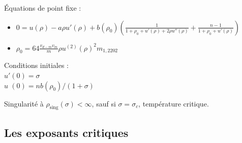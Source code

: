 \documentclass[xcolor=dvipsnames]{beamer}
\begin{document}
\begin{frame}

\begin{block}{Équations de point fixe :}
\begin{itemize}
\item $0 = u(\rho) - a  \rho u'(\rho) + b(\rho_0) \left( \frac{1}{1 + \rho_0 + u'(\rho) + 2 \rho u''(\rho)} + \frac{n-1}{1+\rho_0+u'(\rho)} \right)$ \\
\phantom{ddfdf}
\item $\rho_0 = 64 \frac{ v_{d-m} v_m}{m} \rho u^{(2)}(\rho)^2 m_{1,2202} $ \\
\end{itemize}
\end{block}

Conditions initiales :\\
$u'(0) = \sigma$ \\
$u\phantom{'}(0) = n b(\rho_0)/(1+\sigma)$

\begin{block}{}
Singularité à $\rho_\text{sing}(\sigma)<\infty$, sauf si $\sigma = \sigma_c$, \textcolor{BrickRed}{température critique}.
\end{block}


\end{frame}

\subsection{Les exposants critiques}
\end{document}
